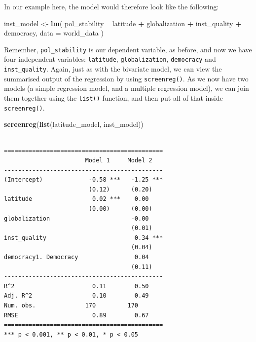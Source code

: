 \documentclass[]{article}
\newenvironment{Shaded}{\begin{snugshade}}{\end{snugshade}}
\newcommand{\DataTypeTok}[1]{\textcolor[rgb]{0.13,0.29,0.53}{#1}}
\newcommand{\KeywordTok}[1]{\textcolor[rgb]{0.13,0.29,0.53}{\textbf{#1}}}
\newcommand{\NormalTok}[1]{#1}
\newcommand{\OperatorTok}[1]{\textcolor[rgb]{0.81,0.36,0.00}{\textbf{#1}}}
\newcommand{\StringTok}[1]{\textcolor[rgb]{0.31,0.60,0.02}{#1}}
\begin{document}
In our example here, the model would therefore look like the following:

\begin{Shaded}
\begin{Highlighting}[]
\NormalTok{inst_model <-}\StringTok{ }\KeywordTok{lm}\NormalTok{(}
\NormalTok{  pol_stability }\OperatorTok{~}\StringTok{ }\NormalTok{latitude }\OperatorTok{+}\StringTok{ }\NormalTok{globalization }\OperatorTok{+}\StringTok{ }\NormalTok{inst_quality }\OperatorTok{+}\StringTok{ }\NormalTok{democracy, }
  \DataTypeTok{data =}\NormalTok{ world_data}
\NormalTok{)}
\end{Highlighting}
\end{Shaded}

Remember, \texttt{pol\_stability} is our dependent variable, as before, and now we have four independent variables: \texttt{latitude}, \texttt{globalization}, \texttt{democracy} and \texttt{inst\_quality}. Again, just as with the bivariate model, we can view the summarised output of the regression by using \texttt{screenreg()}. As we now have two models (a simple regression model, and a multiple regression model), we can join them together using the \texttt{list()} function, and then put all of that inside \texttt{screenreg()}.

\begin{Shaded}
\begin{Highlighting}[]
\KeywordTok{screenreg}\NormalTok{(}\KeywordTok{list}\NormalTok{(latitude_model, inst_model))}
\end{Highlighting}
\end{Shaded}

\begin{verbatim}

=============================================
                       Model 1     Model 2   
---------------------------------------------
(Intercept)             -0.58 ***   -1.25 ***
                        (0.12)      (0.20)   
latitude                 0.02 ***    0.00    
                        (0.00)      (0.00)   
globalization                       -0.00    
                                    (0.01)   
inst_quality                         0.34 ***
                                    (0.04)   
democracy1. Democracy                0.04    
                                    (0.11)   
---------------------------------------------
R^2                      0.11        0.50    
Adj. R^2                 0.10        0.49    
Num. obs.              170         170       
RMSE                     0.89        0.67    
=============================================
*** p < 0.001, ** p < 0.01, * p < 0.05
\end{verbatim}
\end{document}
